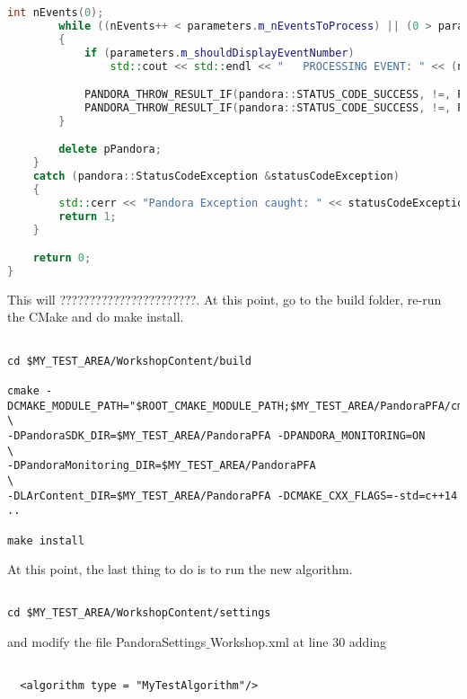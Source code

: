 \begin{lstlisting}[language=C++, caption=Python example]
        int nEvents(0);
        while ((nEvents++ < parameters.m_nEventsToProcess) || (0 > parameters.m_nEventsToProcess))
        {
            if (parameters.m_shouldDisplayEventNumber)
                std::cout << std::endl << "   PROCESSING EVENT: " << (nEvents - 1) << std::endl << std::endl;

            PANDORA_THROW_RESULT_IF(pandora::STATUS_CODE_SUCCESS, !=, PandoraApi::ProcessEvent(*pPandora));
            PANDORA_THROW_RESULT_IF(pandora::STATUS_CODE_SUCCESS, !=, PandoraApi::Reset(*pPandora));
        }

        delete pPandora;
    }
    catch (pandora::StatusCodeException &statusCodeException)
    {
        std::cerr << "Pandora Exception caught: " << statusCodeException.ToString() << std::endl;
        return 1;
    }

    return 0;
}

\end{lstlisting}

This will ???????????????????????.
At this point, go to the build folder, re-run the CMake and do make install.

\begin{verbatim}

cd $MY_TEST_AREA/WorkshopContent/build

cmake -DCMAKE_MODULE_PATH="$ROOT_CMAKE_MODULE_PATH;$MY_TEST_AREA/PandoraPFA/cmakemodules" \
-DPandoraSDK_DIR=$MY_TEST_AREA/PandoraPFA -DPANDORA_MONITORING=ON                         \
-DPandoraMonitoring_DIR=$MY_TEST_AREA/PandoraPFA                                          \
-DLArContent_DIR=$MY_TEST_AREA/PandoraPFA -DCMAKE_CXX_FLAGS=-std=c++14 ..

make install

\end{verbatim}

At this point, the last thing to do is to run the new algorithm.

\begin{verbatim}

cd $MY_TEST_AREA/WorkshopContent/settings

\end{verbatim}

and modify the file PandoraSettings${\_}$Workshop.xml at line 30 adding

\begin{verbatim}

  <algorithm type = "MyTestAlgorithm"/>

\end{verbatim}

